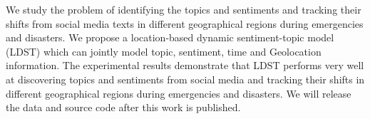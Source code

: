 We study the problem of identifying the topics and sentiments and tracking their shifts from social media texts in different geographical regions during emergencies and disasters. We propose a location-based dynamic sentiment-topic model (LDST) which can jointly model topic, sentiment, time and Geolocation information. The experimental results demonstrate that LDST performs very well at discovering topics and sentiments from social media and tracking their shifts in different geographical regions during emergencies and disasters. We will release the data and source code after this work is published.

